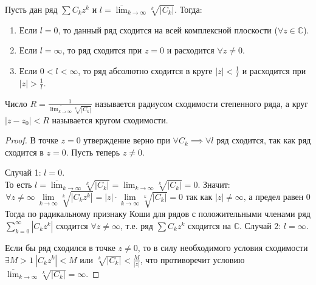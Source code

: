 \begin{theorem*}
    Пусть дан ряд $\sum C_k z^k$ и $l = \overline{\lim}_{k \to \infty} \sqrt[k]{\left| C_k \right|}$. Тогда:
    \begin{enumerate}
        \item Если $l = 0$, то данный ряд сходится на всей комплексной плоскости ($\forall z \in \mathbb{C}$).
        \item Если $l = \infty$, то ряд сходится при $z = 0$ и расходится $\forall z \neq 0$.
        \item Если $0 < l < \infty$, то ряд абсолютно сходится в круге $\left| z \right| < \frac{1}{l}$ и расходится при $\left| z \right| > \frac{1}{l}$.
    \end{enumerate}

    Число $R = \frac{1}{\overline{\lim_{k \to \infty}} \sqrt[k]{\left| C_k \right|}}$ называется радиусом сходимости степенного ряда, а круг $\left| z - z_0 \right| < R$ называется кругом сходимости.

    \begin{proof}
        В точке $z = 0$ утверждение верно при $\forall C_k \implies \forall l$ ряд сходится, так как ряд сходится в $z = 0$. Пусть теперь $z \neq 0$.
        \par Случай 1: $l = 0$. \\
        То есть $l = \overline{\lim}_{k \to \infty} \sqrt[k]{\left| C_k \right|} = \lim_{k \to \infty} \sqrt[k]{\left| C_k \right|} = 0$. Значит:
        \[\forall z \neq \infty \ \lim_{k \to \infty} \sqrt[k]{\left| C_k z^k\right|} = \left| z \right| \cdot \lim_{k \to \infty}\sqrt[k]{\left| C_k \right|} = 0 \text{ так как $\left| z\right|  \neq \infty$, а предел равен 0}\]
        Тогда по радикальному признаку Коши для рядов с положительными членами ряд $\sum_{k=0}^{\infty}\left| C_k z^k \right|$ сходится $\forall z \neq \infty$, т.е. ряд $\sum C_k z^k$ сходится на $\mathbb{C}$.
        \newpage
        Случай 2: $l = \infty$. \par
        Если бы ряд сходился в точке $z \neq 0$, то в силу необходимого условия сходимости $\exists M > 1 \ \left| C_k z^k\right| < M$ или $\sqrt[k]{\left| C_k \right|} < \frac{M}{\left| z \right|}$, что противоречит условию $\overline{\lim}_{k \to \infty} \sqrt[k]{\left| C_k \right|} = \infty$. \par


\end{proof}
\end{theorem*}
